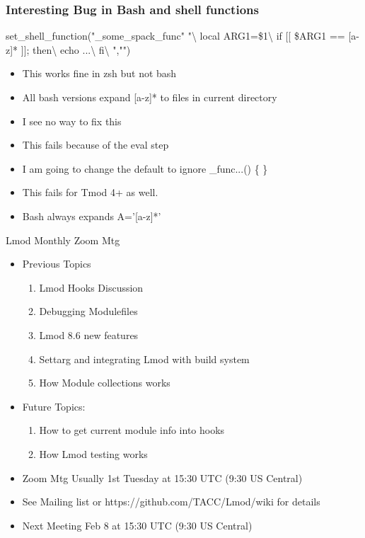 \documentclass{beamer}
\begin{document}
\begin{frame}[fragile]
  \frametitle{Interesting Bug in Bash and shell functions}
    {\tiny
\begin{semiverbatim}
    set_shell_function("_some_spack_func" "\textbackslash
       local ARG1=\$1\textbackslash
       if [[ \$ARG1 == {\color{red}[a-z]*} ]]; then\textbackslash
         echo ...\textbackslash
       fi\textbackslash
    ","")
\end{semiverbatim}
    }
  \begin{itemize}
    \item This works fine in zsh but not bash
    \item All bash versions expand [a-z]\** to files in current directory
    \item I see no way to fix this
    \item This fails because of the eval step
    \item I am going to change the default to ignore {\color{blue}\_func...() \{ \}}
    \item This fails for Tmod 4+ as well.
    \item Bash always expands {\color{blue}A='[a-z]\**'}
  \end{itemize}
\end{frame}

\begin{frame}{Lmod Monthly Zoom Mtg}
  \begin{itemize}
    \item Previous Topics
      \begin{enumerate}
        \item Lmod Hooks Discussion
        \item Debugging Modulefiles
        \item Lmod 8.6 new features
        \item Settarg and integrating Lmod with build system
        \item How Module collections works 
      \end{enumerate}
    \item Future Topics: 
      \begin{enumerate}
        \item How to get current module info into hooks
        \item How Lmod testing works
      \end{enumerate}
    \item Zoom Mtg Usually 1st Tuesday at 15:30 UTC (9:30 US Central)
    \item See Mailing list or https://github.com/TACC/Lmod/wiki for
      details
    \item Next Meeting Feb 8 at 15:30 UTC (9:30 US Central)
  \end{itemize}
\end{frame}
\end{document}
